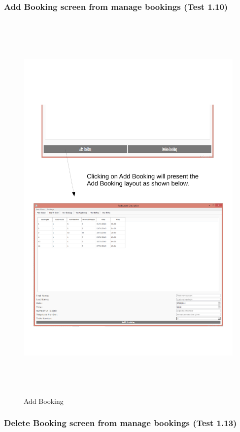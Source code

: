 \subsubsection{Add Booking screen from manage bookings (Test 1.10)}

\begin{figure}[H]
    \includegraphics[height = 20cm]{./Testing/images/test2.pdf}
    \caption{Add Booking} \label{fig:Test2}
\end{figure}

\subsubsection{Delete Booking screen from manage bookings (Test 1.13)}

